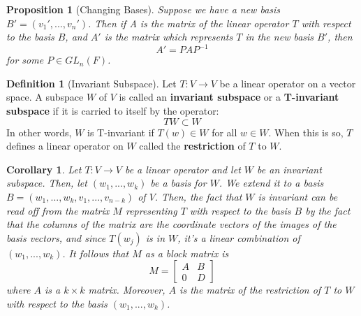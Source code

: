 \documentclass[12pt]{article}
\newtheorem{cor}[thm]{Corollary}
\newtheorem{prop}[thm]{Proposition}
\theoremstyle{definition}
\newtheorem{defn}[thm]{Definition}
\theoremstyle{remark}
\numberwithin{equation}{section}
\newcommand\B[1]{\textbf{ #1}}
\begin{document}
\vspace{15pt}

\begin{prop}[Changing Bases]
        Suppose we have a new basis $B' = (v_1',...,v_n')$. Then if A is the matrix of the linear operator $T$ with respect to the basis $B$, and $A'$ is the matrix which represents $T$ in the new basis $B'$, then \begin{equation}
                A' = PAP^{-1}
        \end{equation}
        for some $P \in GL_n(F)$.
\end{prop}

\vspace{15pt}

\begin{defn}[Invariant Subspace]
        Let $T:V\rightarrow V$ be a linear operator on a vector space. A subspace $W$ of $V$ is called an \B{invariant subspace} or a \B{T-invariant subspace} if it is carried to itself by the operator: \begin{equation}
                TW \subset W
        \end{equation}
        In other words, $W$ is T-invariant if $T(w) \in W$ for all $w \in W$. When this is so, $T$ defines a linear operator on $W$ called the \B{restriction} of $T$ to $W$.
\end{defn}


\vspace{15pt}

\begin{cor}
        Let $T:V\rightarrow V$ be a linear operator and let $W$ be an invariant subspace. Then, let $(w_1,...,w_k)$ be a basis for $W$. We extend it to a basis $B = (w_1,...,w_k,v_1,...,v_{n-k})$ of $V$. Then, the fact that $W$ is invariant can be read off from the matrix $M$ representing $T$ with respect to the basis $B$ by the fact that the columns of the matrix are the coordinate vectors of the images of the basis vectors, and since $T(w_j)$ is in $W$, it's a linear combination of $(w_1,...,w_k)$. It follows that $M$ as a block matrix is \begin{equation}
                M = \begin{bmatrix} A & B \\ 0 & D\end{bmatrix}
        \end{equation}
        where $A$ is a $k\times k$ matrix. Moreover, $A$ is the matrix of the restriction of $T$ to $W$ with respect to the basis $(w_1,...,w_k)$.
\end{cor}
\end{document}
